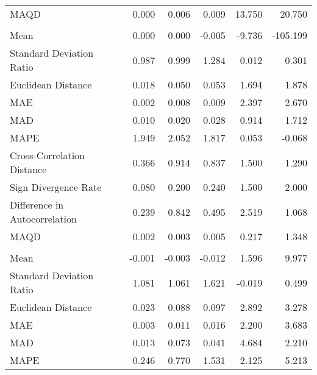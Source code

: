 \begin{landscape}
\begin{ThreePartTable}
\begin{longtable}[t]{lrrrrr}
\hspace{1em}MAQD & 0.000 & 0.006 & 0.009 & 13.750 & 20.750\\
\addlinespace[0.5em]
\multicolumn{6}{l}{\textbf{COL}}\\
\hline
\hspace{1em}Mean & 0.000 & 0.000 & -0.005 & -9.736 & -105.199\\
\hspace{1em}Standard Deviation Ratio & 0.987 & 0.999 & 1.284 & 0.012 & 0.301\\
\hspace{1em}Euclidean Distance & 0.018 & 0.050 & 0.053 & 1.694 & 1.878\\
\hspace{1em}MAE & 0.002 & 0.008 & 0.009 & 2.397 & 2.670\\
\hspace{1em}MAD & 0.010 & 0.020 & 0.028 & 0.914 & 1.712\\
\hspace{1em}MAPE & 1.949 & 2.052 & 1.817 & 0.053 & -0.068\\
\hspace{1em}Cross-Correlation Distance & 0.366 & 0.914 & 0.837 & 1.500 & 1.290\\
\hspace{1em}Sign Divergence Rate & 0.080 & 0.200 & 0.240 & 1.500 & 2.000\\
\hspace{1em}Difference in Autocorrelation & 0.239 & 0.842 & 0.495 & 2.519 & 1.068\\
\hspace{1em}MAQD & 0.002 & 0.003 & 0.005 & 0.217 & 1.348\\
\addlinespace[0.5em]
\multicolumn{6}{l}{\textbf{CRI}}\\
\hline
\hspace{1em}Mean & -0.001 & -0.003 & -0.012 & 1.596 & 9.977\\
\hspace{1em}Standard Deviation Ratio & 1.081 & 1.061 & 1.621 & -0.019 & 0.499\\
\hspace{1em}Euclidean Distance & 0.023 & 0.088 & 0.097 & 2.892 & 3.278\\
\hspace{1em}MAE & 0.003 & 0.011 & 0.016 & 2.200 & 3.683\\
\hspace{1em}MAD & 0.013 & 0.073 & 0.041 & 4.684 & 2.210\\
\hspace{1em}MAPE & 0.246 & 0.770 & 1.531 & 2.125 & 5.213\\

\end{longtable}
\end{ThreePartTable}
\end{landscape}

